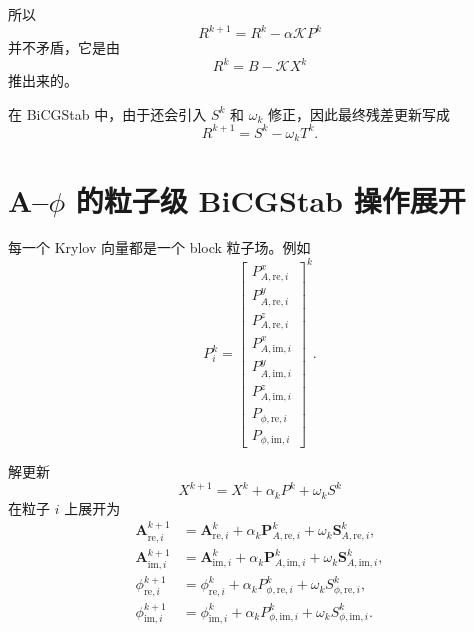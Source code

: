 \documentclass[UTF8,11pt]{ctexart}
\begin{document}
所以
\begin{equation}
    R^{k+1}=R^k-\alpha\mathcal{K}P^k
\end{equation}
并不矛盾，它是由
\begin{equation}
    R^k = B-\mathcal{K}X^k
\end{equation}
推出来的。

在 BiCGStab 中，由于还会引入 $S^k$ 和 $\omega_k$ 修正，因此最终残差更新写成
\begin{equation}
    R^{k+1}=S^k-\omega_k T^k.
\end{equation}

\section{A--$\phi$ 的粒子级 BiCGStab 操作展开}

每一个 Krylov 向量都是一个 block 粒子场。例如
\begin{equation}
    P_i^k
    =
    \begin{bmatrix}
    P^x_{A,\mathrm{re},i}\\
    P^y_{A,\mathrm{re},i}\\
    P^z_{A,\mathrm{re},i}\\
    P^x_{A,\mathrm{im},i}\\
    P^y_{A,\mathrm{im},i}\\
    P^z_{A,\mathrm{im},i}\\
    P_{\phi,\mathrm{re},i}\\
    P_{\phi,\mathrm{im},i}
    \end{bmatrix}^k.
\end{equation}

解更新
\begin{equation}
    X^{k+1}=X^k+\alpha_k P^k+\omega_k S^k
\end{equation}
在粒子 $i$ 上展开为
\begin{align}
    \bm A_{\mathrm{re},i}^{k+1}
    &=
    \bm A_{\mathrm{re},i}^{k}
    +
    \alpha_k \bm P_{A,\mathrm{re},i}^{k}
    +
    \omega_k \bm S_{A,\mathrm{re},i}^{k},
    \\
    \bm A_{\mathrm{im},i}^{k+1}
    &=
    \bm A_{\mathrm{im},i}^{k}
    +
    \alpha_k \bm P_{A,\mathrm{im},i}^{k}
    +
    \omega_k \bm S_{A,\mathrm{im},i}^{k},
    \\
    \phi_{\mathrm{re},i}^{k+1}
    &=
    \phi_{\mathrm{re},i}^{k}
    +
    \alpha_k P_{\phi,\mathrm{re},i}^{k}
    +
    \omega_k S_{\phi,\mathrm{re},i}^{k},
    \\
    \phi_{\mathrm{im},i}^{k+1}
    &=
    \phi_{\mathrm{im},i}^{k}
    +
    \alpha_k P_{\phi,\mathrm{im},i}^{k}
    +
    \omega_k S_{\phi,\mathrm{im},i}^{k}.
\end{align}
\end{document}
